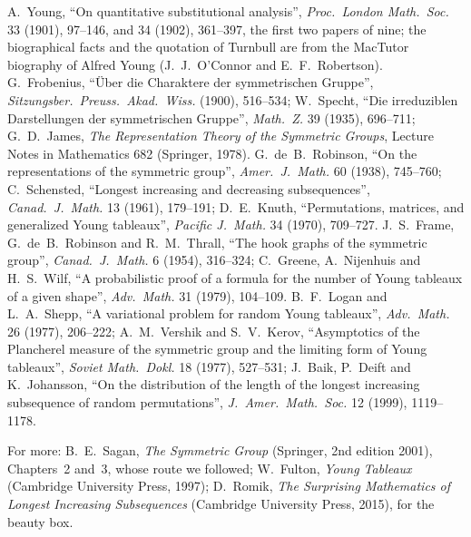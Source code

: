 A.~Young, ``On quantitative substitutional analysis'', \emph{Proc.\ London Math.\ Soc.} 33 (1901), 97--146, and 34 (1902), 361--397, the first two papers of nine; the biographical facts and the quotation of Turnbull are from the MacTutor
biography of Alfred Young (J.~J.~O'Connor and E.~F.~Robertson). G.~Frobenius, ``Über die Charaktere der symmetrischen Gruppe'', \emph{Sitzungsber.\ Preuss.\ Akad.\ Wiss.} (1900), 516--534; W.~Specht, ``Die irreduziblen Darstellungen der
symmetrischen Gruppe'', \emph{Math.\ Z.} 39 (1935), 696--711; G.~D.~James, \emph{The Representation Theory of the Symmetric Groups}, Lecture Notes in Mathematics 682 (Springer, 1978). G.~de~B.~Robinson, ``On the representations of the symmetric
group'', \emph{Amer.\ J.\ Math.} 60 (1938), 745--760; C.~Schensted, ``Longest increasing and decreasing subsequences'', \emph{Canad.\ J.\ Math.} 13 (1961), 179--191; D.~E.~Knuth, ``Permutations, matrices, and generalized Young tableaux'',
\emph{Pacific J.\ Math.} 34 (1970), 709--727. J.~S.~Frame, G.~de~B.~Robinson and R.~M.~Thrall, ``The hook graphs of the symmetric group'', \emph{Canad.\ J.\ Math.} 6 (1954), 316--324; C.~Greene, A.~Nijenhuis and H.~S.~Wilf, ``A probabilistic proof of a
formula for the number of Young tableaux of a given shape'', \emph{Adv.\ Math.} 31 (1979), 104--109. B.~F.~Logan and L.~A.~Shepp, ``A variational problem for random Young tableaux'', \emph{Adv.\ Math.} 26 (1977), 206--222; A.~M.~Vershik and S.~V.~Kerov,
``Asymptotics of the Plancherel measure of the symmetric group and the limiting form of Young tableaux'', \emph{Soviet Math.\ Dokl.} 18 (1977), 527--531; J.~Baik, P.~Deift and K.~Johansson, ``On the distribution of the length of the longest increasing
subsequence of random permutations'', \emph{J.\ Amer.\ Math.\ Soc.} 12 (1999), 1119--1178.

For more: B.~E.~Sagan, \emph{The Symmetric Group} (Springer, 2nd edition 2001), Chapters~2 and~3, whose route we followed; W.~Fulton, \emph{Young Tableaux} (Cambridge University Press, 1997); D.~Romik, \emph{The Surprising Mathematics of Longest
Increasing Subsequences} (Cambridge University Press, 2015), for the beauty box.
